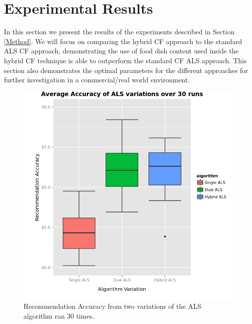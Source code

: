 
\section{Experimental Results}

In this section we present the results of the experiments described in Section \ref{Method}. We will focus on comparing the hybrid CF approach to the standard ALS CF approach, demonstrating the use of food dish content used inside the hybrid CF technique is able to outperform the standard CF ALS approach. This section also demonstrates the optimal parameters for the different approaches for further investigation in a commercial/real world environment.  

\begin{figure}
\centering
\includegraphics[scale=0.7]{images/contaminated_accuracy.png}
\caption{Recommendation Accuracy from two variations of the ALS algorithm ran 30 times.}
\label{fig:algorithms}
\end{figure}


